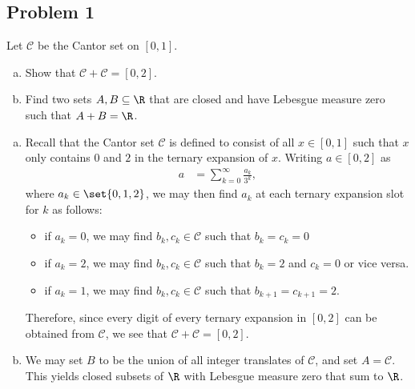 \documentclass[10pt]{mypackage}
\begin{document}
\subsection{Problem 1}%
\begin{problem}
  Let $\mathcal{C}$ be the Cantor set on $[0,1]$.
  \begin{enumerate}[(a)]
    \item Show that $\mathcal{C} + \mathcal{C} = [0,2]$.
    \item Find two sets $A,B\subseteq \R$ that are closed and have Lebesgue measure zero such that $A+B = \R$.
  \end{enumerate}
\end{problem}
\begin{enumerate}[(a)]
  \item Recall that the Cantor set $\mathcal{C}$ is defined to consist of all $x\in [0,1]$ such that $x$ only contains $0$ and $2$ in the ternary expansion of $x$. Writing $a\in [0,2]$ as
    \begin{align*}
      a &= \sum_{k=0}^{\infty}\frac{a_k}{3^{k}},
    \end{align*}
    where $a_k\in\set{0,1,2}$, we may then find $a_k$ at each ternary expansion slot for $k$ as follows:
    \begin{itemize}
      \item if $a_k = 0$, we may find $b_k,c_k\in \mathcal{C}$ such that $b_k = c_k = 0$
      \item if $a_k = 2$, we may find $b_k,c_k\in \mathcal{C}$ such that $b_k = 2$ and $c_k = 0$ or vice versa.
      \item if $a_k = 1$, we may find $b_k,c_k\in \mathcal{C}$ such that $b_{k+1} = c_{k+1} = 2$.
    \end{itemize}
    Therefore, since every digit of every ternary expansion in $[0,2]$ can be obtained from $\mathcal{C}$, we see that $\mathcal{C} + \mathcal{C} = [0,2]$.
  \item We may set $B$ to be the union of all integer translates of $\mathcal{C}$, and set $A = \mathcal{C}$. This yields closed subsets of $\R$ with Lebesgue measure zero that sum to $\R$.
\end{enumerate}
\end{document}
